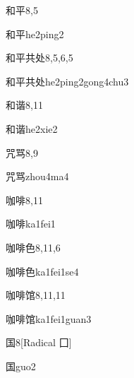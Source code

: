 \begin{entry}{和平}{8,5}
  \begin{phonetics}{和平}{he2ping2}
  \end{phonetics}
\end{entry}

\begin{entry}{和平共处}{8,5,6,5}
  \begin{phonetics}{和平共处}{he2ping2gong4chu3}
  \end{phonetics}
\end{entry}

\begin{entry}{和谐}{8,11}
  \begin{phonetics}{和谐}{he2xie2}
  \end{phonetics}
\end{entry}

\begin{entry}{咒骂}{8,9}
  \begin{phonetics}{咒骂}{zhou4ma4}
  \end{phonetics}
\end{entry}

\begin{entry}{咖啡}{8,11}
  \begin{phonetics}{咖啡}{ka1fei1}
  \end{phonetics}
\end{entry}

\begin{entry}{咖啡色}{8,11,6}
  \begin{phonetics}{咖啡色}{ka1fei1se4}
  \end{phonetics}
\end{entry}

\begin{entry}{咖啡馆}{8,11,11}
  \begin{phonetics}{咖啡馆}{ka1fei1guan3}
  \end{phonetics}
\end{entry}

\begin{entry}{国}{8}[Radical ⼞]
  \begin{phonetics}{国}{guo2}
  \end{phonetics}
\end{entry}


